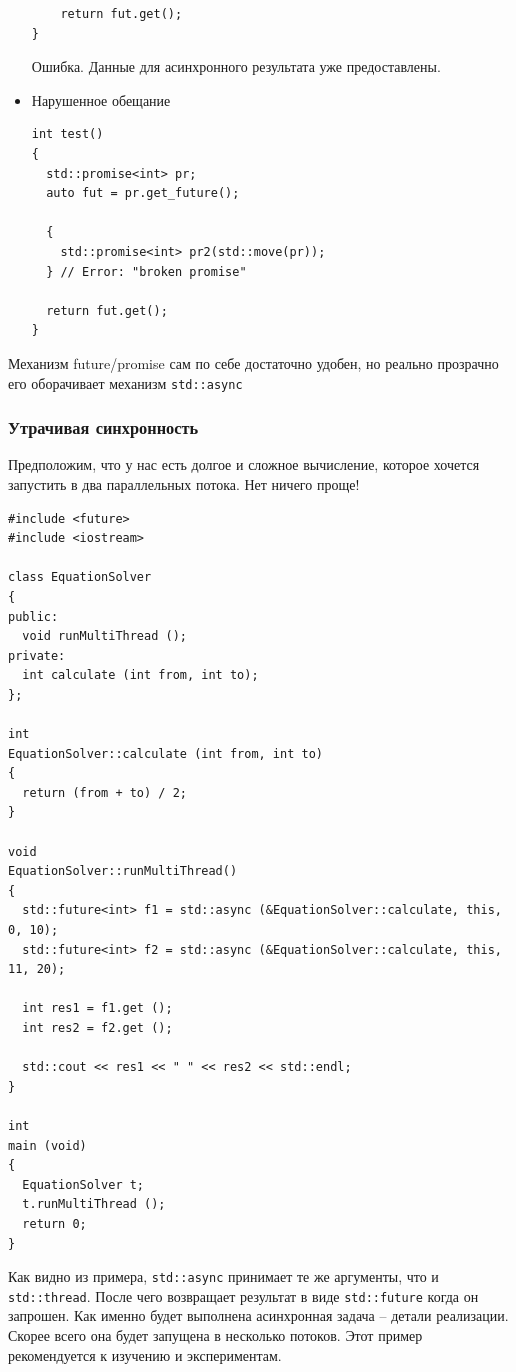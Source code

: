 \documentclass[a4paper,12pt,oneside]{article}
\begin{document}
\begin{itemize}
\begin{lstlisting}
    return fut.get();
}
\end{lstlisting}

Ошибка. Данные для асинхронного результата уже предоставлены.

\item Нарушенное обещание
\begin{lstlisting}
int test()
{
  std::promise<int> pr;
  auto fut = pr.get_future();

  {
    std::promise<int> pr2(std::move(pr));
  } // Error: "broken promise"

  return fut.get();
}
\end{lstlisting}

\end{itemize}

Механизм future/promise сам по себе достаточно удобен, но реально прозрачно его оборачивает механизм \lstinline!std::async!

\subsubsection{Утрачивая синхронность}

Предположим, что у нас есть долгое и сложное вычисление, которое хочется запустить в два параллельных потока. Нет ничего проще!

\begin{lstlisting}
#include <future>
#include <iostream>

class EquationSolver
{
public:
  void runMultiThread ();
private:
  int calculate (int from, int to);  
};

int 
EquationSolver::calculate (int from, int to)
{
  return (from + to) / 2;
}

void 
EquationSolver::runMultiThread()
{
  std::future<int> f1 = std::async (&EquationSolver::calculate, this,  0, 10);
  std::future<int> f2 = std::async (&EquationSolver::calculate, this, 11, 20);

  int res1 = f1.get ();
  int res2 = f2.get ();

  std::cout << res1 << " " << res2 << std::endl;
}

int
main (void)
{
  EquationSolver t;
  t.runMultiThread ();
  return 0;
}
\end{lstlisting}

Как видно из примера, \lstinline!std::async! принимает те же аргументы, что и \lstinline!std::thread!. После чего возвращает результат в виде \lstinline!std::future! когда он запрошен. Как именно будет выполнена асинхронная задача -- детали реализации. Скорее всего она будет запущена в несколько потоков.
Этот пример рекомендуется к изучению и экспериментам.
\end{document}
